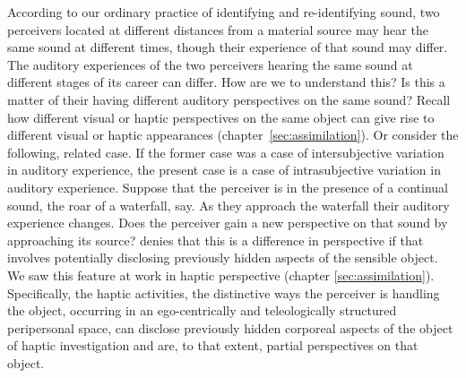 According to our ordinary practice of identifying and re-identifying sound, two perceivers located at different distances from a material source may hear the same sound at different times, though their experience of that sound may differ. The auditory experiences of the two perceivers hearing the same sound at different stages of its career can differ. How are we to understand this? Is this a matter of their having different auditory perspectives on the same sound? Recall how different visual or haptic perspectives on the same object can give rise to different visual or haptic appearances (chapter~\ref{sec:assimilation}). Or consider the following, related case. If the former case was a case of intersubjective variation in auditory experience, the present case is a case of intrasubjective variation in auditory experience. Suppose that the perceiver is in the presence of a continual sound, the roar of a waterfall, say. As they approach the waterfall their auditory experience changes. Does the perceiver gain a new perspective on that sound by approaching its source? \citet[135]{Smith:2002sa} denies that this is a difference in perspective if that involves potentially disclosing previously hidden aspects of the sensible object. We saw this feature at work in haptic perspective (chapter \ref{sec:assimilation}). Specifically, the haptic activities, the distinctive ways the perceiver is handling the object, occurring in an ego-centrically and teleologically structured peripersonal space, can disclose previously hidden corporeal aspects of the object of haptic investigation and are, to that extent, partial perspectives on that object. 


